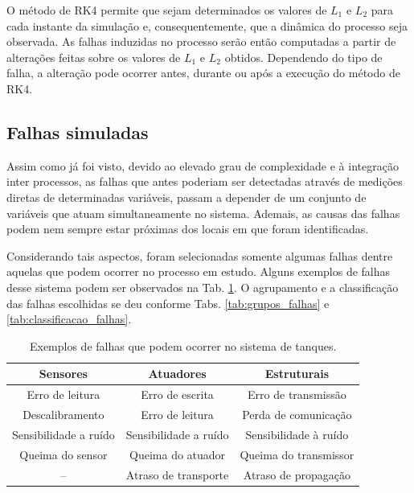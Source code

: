 O método de RK4 permite que sejam determinados os valores de $L_1$ e $L_2$ para
cada instante da simulação e, consequentemente, que a dinâmica do processo seja
observada. As falhas induzidas no processo serão então computadas a partir de
alterações feitas sobre os valores de $L_1$ e $L_2$ obtidos. Dependendo do tipo
de falha, a alteração pode ocorrer antes, durante ou após a execução do método
de RK4.

\subsection{Falhas simuladas}
Assim como já foi visto, devido ao elevado grau de complexidade e à integração
inter processos, as falhas que antes poderiam ser detectadas através de medições
diretas de determinadas variáveis, passam a depender de um conjunto de variáveis
que atuam simultaneamente no sistema.  Ademais, as causas das falhas podem nem
sempre estar próximas dos locais em que foram identificadas.

Considerando tais aspectos, foram selecionadas somente algumas falhas dentre
aquelas que podem ocorrer no processo em estudo. Alguns exemplos de falhas desse
sistema podem ser observados na Tab. \ref{tab:selecao_falhas}. O agrupamento e a
classificação das falhas escolhidas se deu conforme Tabs.
\ref{tab:grupos_falhas} e \ref{tab:classificacao_falhas}.

\begin{table}[!htb]
\small
\centering
\caption{Exemplos de falhas que podem ocorrer no sistema de tanques.}
\label{tab:selecao_falhas}
\vspace{0.25cm}
\begin{tabular}{|c|c|c|}
\hline
{\bf Sensores} & {\bf Atuadores} & {\bf Estruturais}\\
\hline
\hline
Erro de leitura & Erro de escrita & Erro de transmissão\\
\hline
Descalibramento & Erro de leitura & Perda de comunicação\\
\hline
Sensibilidade a ruído & Sensibilidade a ruído & Sensibilidade à ruído\\
\hline
Queima do sensor & Queima do atuador & Queima do transmissor\\
\hline
-- & Atraso de transporte & Atraso de propagação\\
\hline
\end{tabular}
\end{table}

